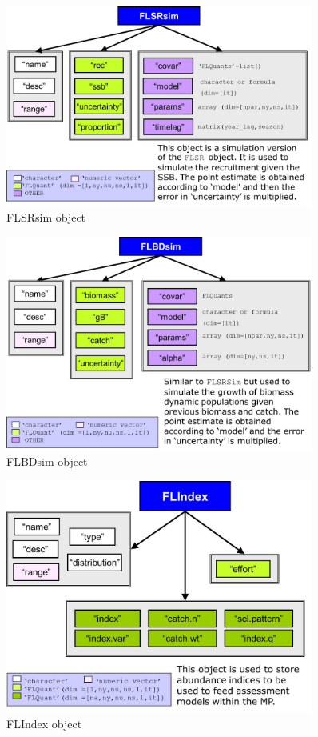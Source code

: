 \begin{figure}[!h]
  \centering
    \includegraphics[width= 0.9\textwidth]{FLSRsim}
  \caption{FLSRsim object}
  \label{fig:FLSRsim}
\end{figure}

\begin{figure}[!h]
  \centering
    \includegraphics[width= 0.9\textwidth]{FLBDsim}
  \caption{FLBDsim object}
  \label{fig:FLBDsim}
\end{figure}

\begin{figure}[!h]
  \centering
    \includegraphics[width= 0.9\textwidth]{FLIndex}
  \caption{FLIndex object}
  \label{fig:FLIndex}
\end{figure}


